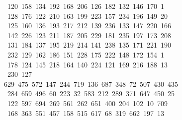 \begin{tabbing}
\ 120\ 158\ 134\ 192\ 168\ 206\ 126\ 182\ 132\ 146\ 170\ 1\\[0pt]
\ 128\ 176\ 122\ 210\ 163\ 199\ 223\ 157\ 234\ 196\ 149\ 20\\[0pt]
\ 125\ 160\ 136\ 193\ 217\ 212\ 139\ 236\ 133\ 147\ 220\ 166\\[0pt]
\>\ 142\ 226\ 123\ 211\ 187\ 205\ 229\ 181\ 235\ 197\ 173\ 208\\[0pt]
\>\ 131\ 184\ 137\ 195\ 219\ 214\ 141\ 238\ 135\ 171\ 221\ 190\ \\[0pt]
\ 232\ 129\ 162\ 186\ 151\ 228\ 175\ 222\ 148\ 172\ 154\ 1\\[0pt]
\ 178\ 124\ 145\ 218\ 164\ 140\ 224\ 121\ 169\ 216\ 188\ 13\\[0pt]
\ 230\ 127\ \\[0pt]
629\ 475\ 572\ 147\ 244\ 719\ 136\ 687\ 348\ 72\ 507\ 430\ 435\\[0pt]
\>\ 284\ 659\ 496\ 60\ 223\ 32\ 583\ 212\ 289\ 371\ 647\ 450\ 25\\[0pt]
\>\ 122\ 597\ 694\ 269\ 561\ 262\ 651\ 400\ 204\ 102\ 10\ 709\ \\[0pt]
\ 168\ 363\ 551\ 457\ 158\ 515\ 617\ 68\ 319\ 662\ 197\ 13\\[0pt]

\end{tabbing}
